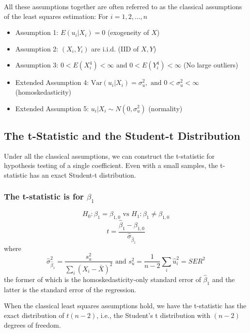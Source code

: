 \documentclass[a4paper,11pt]{article}
\newcommand{\var}{\mathrm{Var}}
\begin{document}
All these assumptions together are often referred to as the classical
assumptions of the least squares estimation:
For \(i = 1, 2, \ldots, n\)
\begin{itemize}
\item Assumption 1: \(E(u_i | X_i) = 0\) (exogeneity of \(X\))
\item Assumption 2: \((X_i, Y_i)\) are i.i.d. (IID of \(X, Y\))
\item Assumption 3: \(0 < E(X_i^4) < \infty\) and \(0 < E(Y_i^4) < \infty\)
(No large outliers)
\item Extended Assumption 4: \(\var(u_i | X_i) = \sigma^2_u, \text{ and } 0 <
                   \sigma^2_u < \infty\) (homoskedasticity)
\item Extended Assumption 5: \(u_i | X_i \sim N(0, \sigma^2_u)\) (normality)
\end{itemize}


\subsection{The t-Statistic and the Student-t Distribution}
\label{sec:orgb53207a}

Under all the classical assumptions, we can construct the
t-statistic for hypothesis testing of a single coefficient. Even with
a small samples, the t-statistic has an exact Student-t distribution. 

\subsubsection*{The t-statistic is for \(\beta_1\)}
\label{sec:org187818a}

\[H_0: \beta_1 = \beta_{1,0} \text{ vs } H_1: \beta_1 \neq \beta_{1,0}\]
\begin{equation}
t = \frac{\hat{\beta}_1 - \beta_{1,0}}{\hat{\sigma}_{\hat{\beta}_1}}
\end{equation}
where
\begin{equation*}
\hat{\sigma}^2_{\hat{\beta}_1} = \frac{s^2_u}{\sum_i (X_i - \bar{X})^2} \text{ and } s^2_u = \frac{1}{n-2}\sum_i \hat{u}_i^2 = SER^2
\end{equation*}
the former of which is the homoskedasticity-only standard error of
\(\hat{\beta}_1\) and the latter is the standard error of the
regression. 

When the classical least squares assumptions hold, we have the
t-statistic has the exact distribution of \(t(n-2)\), i.e., the
Student's t distribution with \((n-2)\) degrees of freedom. 
\end{document}
